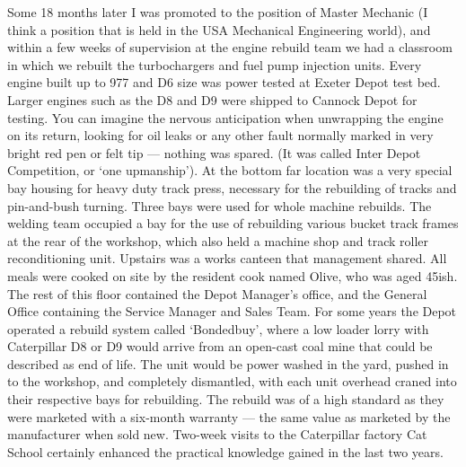
Some 18 months later I was promoted to the position of Master Mechanic (I think
a position that is held in the USA Mechanical Engineering world), and within a
few weeks of supervision at the engine rebuild team we had a classroom in which
we rebuilt the turbochargers and fuel pump injection units. Every engine built
up to 977 and D6 size was power tested at Exeter Depot test bed. Larger engines
such as the D8 and D9 were shipped to Cannock Depot for testing. You can
imagine the nervous anticipation when unwrapping the engine on its return,
looking for oil leaks or any other fault normally marked in very bright red pen
or felt tip --- nothing was spared. (It was called Inter Depot Competition, or
`one upmanship'). At the bottom far location was a very special bay housing for
heavy duty track press, necessary for the rebuilding of tracks and pin-and-bush
turning. Three bays were used for whole machine rebuilds. The welding team
occupied a bay for the use of rebuilding various bucket track frames at the
rear of the workshop, which also held a machine shop and track roller
reconditioning unit. Upstairs was a works canteen that management shared. All
meals were cooked on site by the resident cook named Olive, who was aged 45ish.
The rest of this floor contained the Depot Manager's office, and the General
Office containing the Service Manager and Sales Team. For some years the Depot
operated a rebuild system called `Bondedbuy', where a low loader lorry with
Caterpillar D8 or D9 would arrive from an open-cast coal mine that could be
described as end of life. The unit would be power washed in the yard, pushed in
to the workshop, and completely dismantled, with each unit overhead craned into
their respective bays for rebuilding. The rebuild was of a high standard as
they were marketed with a six-month warranty --- the same value as marketed by
the manufacturer when sold new. Two-week visits to the Caterpillar factory
Cat School certainly enhanced the practical knowledge gained in the last two
years.

